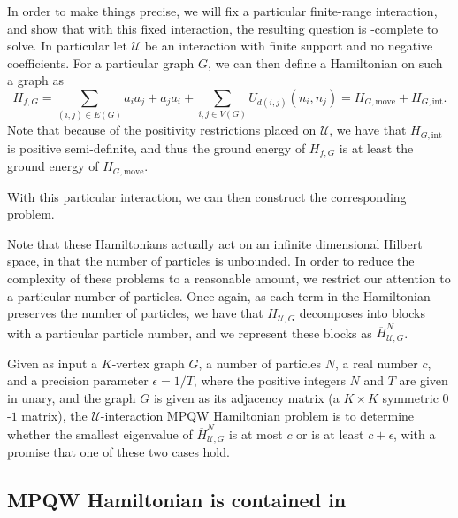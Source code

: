 \documentclass[../thesis-main/thesis-main]{subfiles}
\begin{document}
In order to make things precise, we will fix a particular finite-range interaction, and show that with this fixed interaction, the resulting question is \QMA-complete to solve.  In particular let $\mathcal{U}$ be an interaction with finite support and no negative coefficients.  For a particular graph $G$, we can then define a Hamiltonian on such a graph as
\begin{equation}
H_{f,G} = \sum_{(i,j)\in E(G)} a_ia_j + a_j a_i + \sum_{i,j\in V(G)} U_{d(i,j)}(n_i,n_j) = H_{G,\text{move}} + H_{G,\text{int}}.
\end{equation}
Note that because of the positivity restrictions placed on $\mathcal{U}$, we have that $H_{G,\text{int}}$ is positive semi-definite, and thus the ground energy of $H_{f,G}$ is at least the ground energy of $H_{G,\text{move}}$.

With this particular interaction, we can then construct the corresponding problem. 

Note that these Hamiltonians actually act on an infinite dimensional Hilbert space, in that the number of particles is unbounded.  In order to reduce the complexity of these problems to a reasonable amount, we restrict our attention to a particular number of particles.  Once again, as each term in the Hamiltonian preserves the number of particles, we have that $H_{\mathcal{U},G}$ decomposes into blocks with a particular particle number, and we represent these blocks as $\overline{H}_{\mathcal{U},G}^N$.  

\begin{problem}
  Given as input a $K$-vertex graph $G$, a number of particles $N$, a real number $c$, and a precision parameter $\epsilon = 1/T$, where the positive integers $N$ and $T$ are given in unary, and the graph $G$ is given as its adjacency matrix (a $K\times K$ symmetric $0$-$1$ matrix), the $\mathcal{U}$-interaction MPQW Hamiltonian problem is to determine whether the smallest eigenvalue of $\overline{H}_{\mathcal{U},G}^N$ is at most $c$ or is at least $c+\epsilon$, with a promise that one of these two cases hold.
\end{problem}


\subsection{MPQW Hamiltonian is contained in \QMA}
\label{sec:containment_in_QMA}
\end{document}
